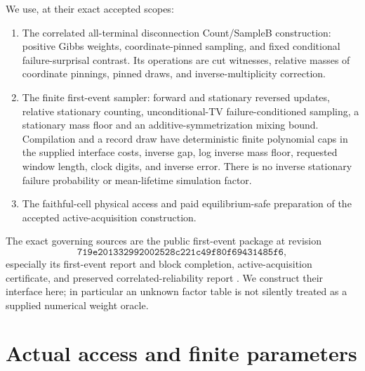 \documentclass[11pt]{article}
\begin{document}
We use, at their exact accepted scopes:
\begin{enumerate}
\item The correlated all-terminal disconnection Count/SampleB construction:
positive Gibbs weights, coordinate-pinned sampling, and fixed conditional
failure-surprisal contrast. Its operations are cut witnesses, relative masses
of coordinate pinnings, pinned draws, and inverse-multiplicity correction.
\item The finite first-event sampler: forward and stationary reversed updates,
relative stationary counting, unconditional-TV failure-conditioned sampling,
a stationary mass floor and an additive-symmetrization mixing bound. Compilation
and a record draw have deterministic finite polynomial caps in the supplied
interface costs, inverse gap, log inverse mass floor, requested window length,
clock digits, and inverse error. There is no inverse stationary failure
probability or mean-lifetime simulation factor.
\item The faithful-cell physical access and paid equilibrium-safe preparation
of the accepted active-acquisition construction.
\end{enumerate}
The exact governing sources are the public first-event package at revision
\[
\texttt{719e201332992002528c221c49f80f69431485f6},
\]
especially its first-event
report and block completion, active-acquisition certificate, and preserved
correlated-reliability report \cite{accepted}.
We construct their interface here; in particular an unknown factor table is
not silently treated as a supplied numerical weight oracle.

\section{Actual access and finite parameters}
\end{document}

